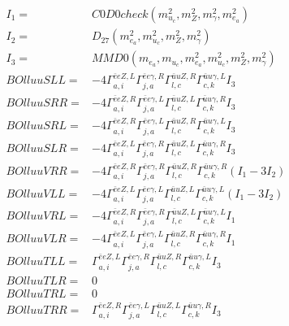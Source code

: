 \documentclass[A4,landscape]{article}
\begin{document}
\begin{align} 
I_1 = & C0D0check(m^2_{u_{{c}}}, m^2_{Z}, m^2_{\gamma}, m^2_{e_{{a}}}) \\ 
I_2 = & D_{27}(m^2_{e_{{a}}}, m^2_{u_{{c}}}, m^2_{Z}, m^2_{\gamma}) \\ 
I_3 = & MMD0(m_{e_{{a}}}, m_{u_{{c}}}, m^2_{e_{{a}}}, m^2_{u_{{c}}}, m^2_{Z}, m^2_{\gamma}) \\ 
  BOlluuSLL= & -4  \Gamma^{\bar{e}e Z ,L}_{a, i} \Gamma^{\bar{e}e \gamma ,R}_{j, a} \Gamma^{\bar{u}u Z ,R}_{l, c} \Gamma^{\bar{u}u \gamma ,L}_{c, k} I_3 \\ 
  BOlluuSRR= & -4  \Gamma^{\bar{e}e Z ,R}_{a, i} \Gamma^{\bar{e}e \gamma ,L}_{j, a} \Gamma^{\bar{u}u Z ,L}_{l, c} \Gamma^{\bar{u}u \gamma ,R}_{c, k} I_3 \\ 
  BOlluuSRL= & -4  \Gamma^{\bar{e}e Z ,R}_{a, i} \Gamma^{\bar{e}e \gamma ,L}_{j, a} \Gamma^{\bar{u}u Z ,R}_{l, c} \Gamma^{\bar{u}u \gamma ,L}_{c, k} I_3 \\ 
  BOlluuSLR= & -4  \Gamma^{\bar{e}e Z ,L}_{a, i} \Gamma^{\bar{e}e \gamma ,R}_{j, a} \Gamma^{\bar{u}u Z ,L}_{l, c} \Gamma^{\bar{u}u \gamma ,R}_{c, k} I_3 \\ 
  BOlluuVRR= & -4  \Gamma^{\bar{e}e Z ,R}_{a, i} \Gamma^{\bar{e}e \gamma ,R}_{j, a} \Gamma^{\bar{u}u Z ,R}_{l, c} \Gamma^{\bar{u}u \gamma ,R}_{c, k} (I_1 - 3 I_2) \\ 
  BOlluuVLL= & -4  \Gamma^{\bar{e}e Z ,L}_{a, i} \Gamma^{\bar{e}e \gamma ,L}_{j, a} \Gamma^{\bar{u}u Z ,L}_{l, c} \Gamma^{\bar{u}u \gamma ,L}_{c, k} (I_1 - 3 I_2) \\ 
  BOlluuVRL= & -4  \Gamma^{\bar{e}e Z ,R}_{a, i} \Gamma^{\bar{e}e \gamma ,R}_{j, a} \Gamma^{\bar{u}u Z ,L}_{l, c} \Gamma^{\bar{u}u \gamma ,L}_{c, k} I_1 \\ 
  BOlluuVLR= & -4  \Gamma^{\bar{e}e Z ,L}_{a, i} \Gamma^{\bar{e}e \gamma ,L}_{j, a} \Gamma^{\bar{u}u Z ,R}_{l, c} \Gamma^{\bar{u}u \gamma ,R}_{c, k} I_1 \\ 
  BOlluuTLL= &  \Gamma^{\bar{e}e Z ,L}_{a, i} \Gamma^{\bar{e}e \gamma ,R}_{j, a} \Gamma^{\bar{u}u Z ,R}_{l, c} \Gamma^{\bar{u}u \gamma ,L}_{c, k} I_3 \\ 
  BOlluuTLR= & 0 \\ 
  BOlluuTRL= & 0 \\ 
  BOlluuTRR= &  \Gamma^{\bar{e}e Z ,R}_{a, i} \Gamma^{\bar{e}e \gamma ,L}_{j, a} \Gamma^{\bar{u}u Z ,L}_{l, c} \Gamma^{\bar{u}u \gamma ,R}_{c, k} I_3 \\ 
\end{align} 
\end{document}
